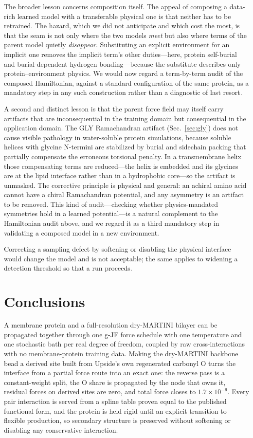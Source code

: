 \documentclass[journal=jctcce,manuscript=article,layout=twocolumn]{achemso}
\begin{document}
The broader lesson concerns composition itself. The appeal of composing a data-rich
learned model with a transferable physical one is that neither has to be retrained.
The hazard, which we did not anticipate and which cost the most, is that the seam is
not only where the two models \emph{meet} but also where terms of the parent model
quietly \emph{disappear}. Substituting an explicit environment for an implicit one
removes the implicit term's other duties---here, protein self-burial and
burial-dependent hydrogen bonding---because the substitute describes only
protein--environment physics. We would now regard a term-by-term audit of the composed
Hamiltonian, against a standard configuration of the same protein, as a mandatory
step in any such construction rather than a diagnostic of last resort.

A second and distinct lesson is that the parent force field may itself carry
artifacts that are inconsequential in the training domain but consequential in the
application domain. The GLY Ramachandran artifact (Sec.~\ref{sec:gly}) does not cause
visible pathology in water-soluble protein simulations, because soluble helices with
glycine N-termini are stabilized by burial and sidechain packing that partially
compensate the erroneous torsional penalty. In a transmembrane helix those compensating
terms are reduced---the helix is embedded and its glycines are at the lipid interface
rather than in a hydrophobic core---so the artifact is unmasked. The corrective
principle is physical and general: an achiral amino acid cannot have a chiral
Ramachandran potential, and any asymmetry is an artifact to be removed. This kind of
audit---checking whether physics-mandated symmetries hold in a learned potential---is a
natural complement to the Hamiltonian audit above, and we regard it as a third
mandatory step in validating a composed model in a new environment.

Correcting a sampling defect by softening or disabling the physical interface would
change the model and is not acceptable; the same applies to widening a detection
threshold so that a run proceeds.

\section{Conclusions}

A membrane protein and a full-resolution dry-MARTINI bilayer can be propagated
together through one g-JF force schedule with one temperature and one stochastic bath
per real degree of freedom, coupled by raw cross-interactions with no
membrane-protein training data. Making the dry-MARTINI backbone bead a derived site
built from Upside's own regenerated carbonyl O turns the interface from a partial
force route into an exact one: the reverse pass is a constant-weight split, the O
share is propagated by the node that owns it, residual forces on derived sites are
zero, and total force closes to $1.7\times10^{-9}$. Every pair interaction is served
from a spline table proven equal to the published functional form, and the protein is
held rigid until an explicit transition to flexible production, so secondary
structure is preserved without softening or disabling any conservative interaction.
\end{document}
